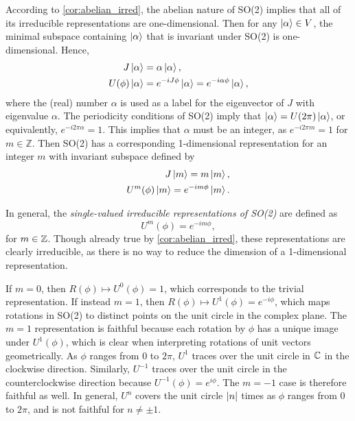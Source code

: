According to \cref{cor:abelian_irred}, the abelian nature of SO(2) implies that all of its irreducible representations are one-dimensional. Then for any $\ket{\alpha}\in V$, the minimal subspace containing $\ket{\alpha}$ that is invariant under SO(2) is one-dimensional. Hence,
\begin{align}
    J\ket{\alpha} &= \alpha\ket{\alpha}, \\
    U(\phi)\ket{\alpha} &= e^{-iJ\phi}\ket{\alpha} = e^{-i\alpha\phi}\ket{\alpha},
\end{align}
where the (real) number $\alpha$ is used as a label for the eigenvector of $J$ with eigenvalue $\alpha$. The periodicity conditions of SO(2) imply that $\ket{\alpha} = U(2\pi)\ket{\alpha}$, or equivalently, $e^{-i2\pi\alpha} = 1$. This implies that $\alpha$ must be an integer, as $e^{-i2\pi m} = 1$ for $m\in\mathbb{Z}$. Then SO(2) has a corresponding 1-dimensional representation for an integer $m$ with invariant subspace defined by
\begin{align}
    J\ket{m} = m\ket{m}, \\
    U^m(\phi)\ket{m} = e^{-im\phi}\ket{m}.
\end{align}

In general, the \textit{single-valued irreducible representations of SO(2)} are defined as
\begin{equation}
    U^m(\phi) = e^{-im\phi},
\end{equation}
for $m\in\mathbb{Z}$. Though already true by \cref{cor:abelian_irred}, these representations are clearly irreducible, as there is no way to reduce the dimension of a 1-dimensional representation.

If $m=0$, then $R(\phi)\mapsto U^0(\phi) = 1$, which corresponds to the trivial representation. If instead $m=1$, then $R(\phi)\mapsto U^1(\phi) = e^{-i\phi}$, which maps rotations in SO(2) to distinct points on the unit circle in the complex plane. The $m=1$ representation is faithful because each rotation by $\phi$ has a unique image under $U^1(\phi)$, which is clear when interpreting rotations of unit vectors geometrically. As $\phi$ ranges from 0 to $2\pi$, $U^1$ traces over the unit circle in $\mathbb{C}$ in the clockwise direction. Similarly, $U^{-1}$ traces over the unit circle in the counterclockwise direction because $U^{-1}(\phi)=e^{i\phi}$. The $m=-1$ case is therefore faithful as well. In general, $U^n$ covers the unit circle $\left|n\right|$ times as $\phi$ ranges from 0 to $2\pi$, and is not faithful for $n\neq\pm1$.

